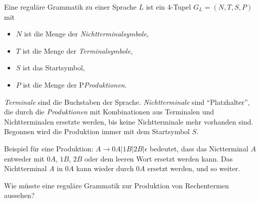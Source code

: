 \documentclass[10pt, a4paper]{scrartcl}
\begin{document}
\begin{infobox}
Eine reguläre Grammatik zu einer Sprache $L$ ist ein 4-Tupel $G_L = (N, T, S, P)$ mit
\begin{itemize}
	\item $N$ ist die Menge der \emph{Nichtterminalsymbole},
	\item $T$ ist die Menge der \emph{Terminalsymbole},
	\item $S$ ist das Startsymbol,
	\item $P$ ist die Menge der P\emph{Produktionen}.
\end{itemize}
\end{infobox}

\emph{Terminale} sind die Buchstaben der Sprache. \emph{Nichtterminale} sind \enquote{Platzhalter}, die durch die \emph{Produktionen} mit Kombinationen aus Terminalen und Nichtterminalen ersetzte werden, bis keine Nichtterminale mehr vorhanden sind. Begonnen wird die Produktion immer mit dem Startsymbol $S$.

{\small Beispiel für eine Produktion: $A \rightarrow 0A | 1B | 2B | \epsilon$ bedeutet, dass das Nictterminal $A$ entweder mit $0A$, $1B$, $2B$ oder dem leeren Wort ersetzt werden kann. Das Nichtterminal $A$ in $0A$ kann wieder durch $0A$ ersetzt werden, und so weiter.}

\begin{aufgabe}
Wie müsste eine reguläre Grammatik zur Produktion von Rechentermen aussehen?
\end{aufgabe}
\end{document}
